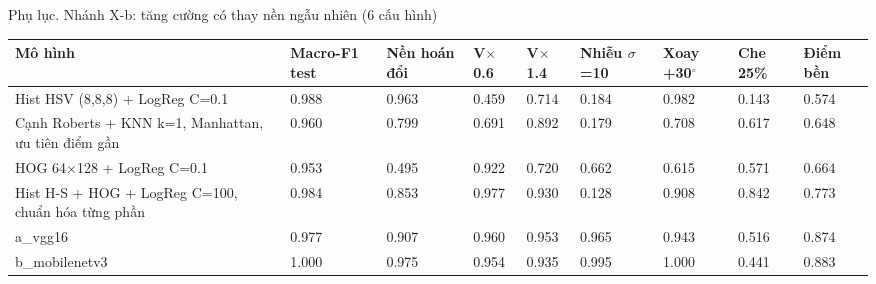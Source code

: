 \documentclass[aspectratio=169,10pt]{beamer}
\begin{document}
\begin{frame}{Phụ lục. Nhánh X-b: tăng cường có thay nền ngẫu nhiên (6 cấu hình)}
\begin{center}\begin{adjustbox}{max width=\linewidth,max totalheight=0.74\textheight}
\begin{tabular}{lllllllll}\toprule
\textbf{Mô hình} & \textbf{Macro-F1 test} & \textbf{Nền hoán đổi} & \textbf{V$\times$0.6} & \textbf{V$\times$1.4} & \textbf{Nhiễu $\sigma$=10} & \textbf{Xoay +30$^\circ$} & \textbf{Che 25\%} & \textbf{Điểm bền} \\ \midrule
Hist HSV (8,8,8) + LogReg C=0.1 & 0.988 & 0.963 & 0.459 & 0.714 & 0.184 & 0.982 & 0.143 & 0.574 \\
Cạnh Roberts + KNN k=1, Manhattan, ưu tiên điểm gần & 0.960 & 0.799 & 0.691 & 0.892 & 0.179 & 0.708 & 0.617 & 0.648 \\
HOG 64$\times$128 + LogReg C=0.1 & 0.953 & 0.495 & 0.922 & 0.720 & 0.662 & 0.615 & 0.571 & 0.664 \\
Hist H-S + HOG + LogReg C=100, chuẩn hóa từng phần & 0.984 & 0.853 & 0.977 & 0.930 & 0.128 & 0.908 & 0.842 & 0.773 \\
a\_vgg16 & 0.977 & 0.907 & 0.960 & 0.953 & 0.965 & 0.943 & 0.516 & 0.874 \\
b\_mobilenetv3 & 1.000 & 0.975 & 0.954 & 0.935 & 0.995 & 1.000 & 0.441 & 0.883 \\
\bottomrule\end{tabular}
\end{adjustbox}\end{center}
\end{frame}
\end{document}
